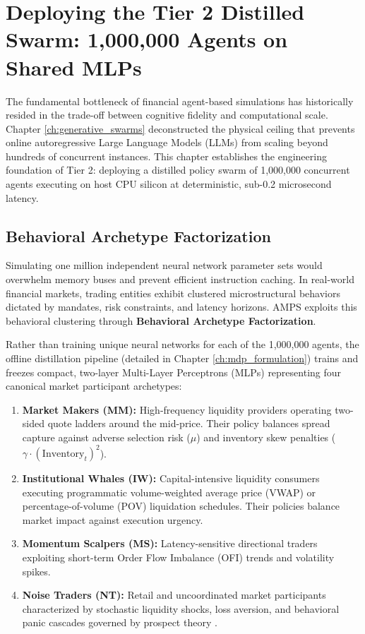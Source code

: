 \chapter{Deploying the Tier 2 Distilled Swarm: 1,000,000 Agents on Shared MLPs}
\label{ch:distilled_swarm_scaling}

The fundamental bottleneck of financial agent-based simulations has historically resided in the trade-off between cognitive fidelity and computational scale. Chapter \ref{ch:generative_swarms} deconstructed the physical ceiling that prevents online autoregressive Large Language Models (LLMs) from scaling beyond hundreds of concurrent instances. This chapter establishes the engineering foundation of Tier 2: deploying a distilled policy swarm of 1,000,000 concurrent agents executing on host CPU silicon at deterministic, sub-0.2 microsecond latency.

\section{Behavioral Archetype Factorization}

Simulating one million independent neural network parameter sets would overwhelm memory buses and prevent efficient instruction caching. In real-world financial markets, trading entities exhibit clustered microstructural behaviors dictated by mandates, risk constraints, and latency horizons. AMPS exploits this behavioral clustering through \textbf{Behavioral Archetype Factorization}.

Rather than training unique neural networks for each of the 1,000,000 agents, the offline distillation pipeline (detailed in Chapter \ref{ch:mdp_formulation}) trains and freezes compact, two-layer Multi-Layer Perceptrons (MLPs) representing four canonical market participant archetypes:

\begin{enumerate}
    \item \textbf{Market Makers (MM):} High-frequency liquidity providers operating two-sided quote ladders around the mid-price. Their policy balances spread capture against adverse selection risk ($\mu$) and inventory skew penalties ($\gamma \cdot (\text{Inventory}_t)^2$).
    \item \textbf{Institutional Whales (IW):} Capital-intensive liquidity consumers executing programmatic volume-weighted average price (VWAP) or percentage-of-volume (POV) liquidation schedules. Their policies balance market impact against execution urgency.
    \item \textbf{Momentum Scalpers (MS):} Latency-sensitive directional traders exploiting short-term Order Flow Imbalance (OFI) trends and volatility spikes.
    \item \textbf{Noise Traders (NT):} Retail and uncoordinated market participants characterized by stochastic liquidity shocks, loss aversion, and behavioral panic cascades governed by prospect theory \cite{kahneman1979prospect}.
\end{enumerate}

